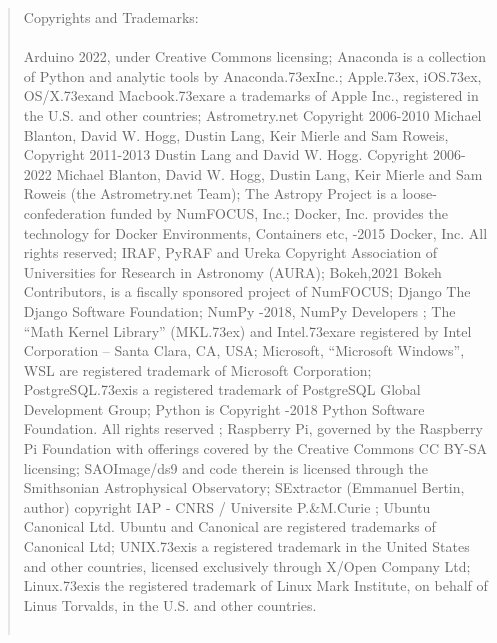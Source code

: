 
\def\wgtrademark{\raise.73ex\hbox{\tiny{\textregistered}}\;}
\def\wgcopyright{\raise.73ex\hbox{\tiny{\copyright}}\;}

\vskip 3cm

\begin{quote}
{ Copyrights and Trademarks:\\ 
\\
Arduino 2022, under Creative Commons licensing;
Anaconda is a collection of Python and analytic tools by Anaconda\wgtrademark Inc.;
Apple\wgtrademark, iOS\wgtrademark,
  OS/X\wgtrademark and Macbook\wgtrademark are a trademarks of Apple Inc., registered 
in the U.S. and other countries;
   Astrometry.net Copyright 2006-2010 Michael Blanton, David W. Hogg, Dustin Lang, 
Keir Mierle and Sam Roweis, Copyright 2011-2013 Dustin Lang and David W. Hogg. 
Copyright 2006-2022 Michael Blanton, David W. Hogg, Dustin Lang, Keir Mierle and 
Sam Roweis \cite{arXiv:0910.2233} (the Astrometry.net Team);
   The Astropy Project \cite{astropy:2018} is a loose-confederation funded by NumFOCUS, Inc.;
Docker, Inc. provides the technology for Docker Environments, Containers etc, -2015 Docker, Inc. All rights reserved;
IRAF, PyRAF and Ureka Copyright  Association of Universities for Research in
  Astronomy (AURA);
  Bokeh,2021 Bokeh Contributors,  is a fiscally sponsored project of NumFOCUS;
  Django The Django Software Foundation;
  NumPy   -2018, NumPy Developers ;
  The ``Math Kernel Library'' (MKL\wgtrademark) and Intel\wgtrademark are registered
  by Intel Corporation -- Santa Clara, CA, USA;
Microsoft, ``Microsoft Windows'', WSL are registered trademark of Microsoft Corporation;
PostgreSQL\wgtrademark is a registered trademark of 
   PostgreSQL Global Development Group;
Python is Copyright -2018 Python  Software Foundation.
   All rights reserved ;
Raspberry Pi, governed by the Raspberry Pi Foundation with offerings covered by the
Creative Commons CC BY-SA licensing;
SAOImage/ds9 and code therein is licensed through the 
   Smithsonian Astrophysical Observatory;
SExtractor \cite{web-sextractor} (Emmanuel Bertin, author) copyright
    IAP - CNRS / Universite P.\&M.Curie ;
Ubuntu  Canonical Ltd. Ubuntu and Canonical are registered 
  trademarks of Canonical  Ltd;
UNIX\wgtrademark is a registered trademark in
  the United States and other countries, licensed exclusively through
  X/Open Company Ltd;
  Linux\wgtrademark is the registered trademark of Linux Mark Institute,
  on behalf of Linus Torvalds, in the U.S. and other countries.
  \\
  ~
}




\end{quote}
